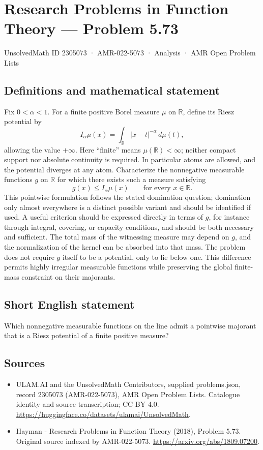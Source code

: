 \documentclass[11pt,a4paper]{article}
\begin{document}
\section*{Research Problems in Function Theory — Problem 5.73}\label{2305073}
{\small UnsolvedMath ID 2305073 · AMR-022-5073 · Analysis · AMR Open Problem Lists}
\subsection{Definitions and mathematical statement}
Fix $0<\alpha<1$. For a finite positive Borel measure $\mu$ on $\mathbb R$, define its Riesz potential by
\[
I_\alpha\mu(x)=\int_{\mathbb R}|x-t|^{-\alpha}\,d\mu(t),
\]
allowing the value $+\infty$. Here ``finite'' means $\mu(\mathbb R)<\infty$; neither compact support nor absolute continuity is required. In particular atoms are allowed, and the potential diverges at any atom.
Characterize the nonnegative measurable functions $g$ on $\mathbb R$ for which there exists such a measure satisfying
\[
g(x)\le I_\alpha\mu(x)\qquad\text{for every }x\in\mathbb R.
\]
This pointwise formulation follows the stated domination question; domination only almost everywhere is a distinct possible variant and should be identified if used. A useful criterion should be expressed directly in terms of $g$, for instance through integral, covering, or capacity conditions, and should be both necessary and sufficient.
The total mass of the witnessing measure may depend on $g$, and the normalization of the kernel can be absorbed into that mass. The problem does not require $g$ itself to be a potential, only to lie below one. This difference permits highly irregular measurable functions while preserving the global finite-mass constraint on their majorants.
\subsection{Short English statement}
Which nonnegative measurable functions on the line admit a pointwise majorant that is a Riesz potential of a finite positive measure?
\subsection{Sources}
\begin{itemize}
\item[S1] ULAM.AI and the UnsolvedMath Contributors, supplied problems.json, record 2305073 (AMR-022-5073), AMR Open Problem Lists. Catalogue identity and source transcription; CC BY 4.0.
\url{https://huggingface.co/datasets/ulamai/UnsolvedMath}.
\item[S2] Hayman - Research Problems in Function Theory (2018), Problem 5.73. Original source indexed by AMR-022-5073.
\url{https://arxiv.org/abs/1809.07200}.
\end{itemize}
\end{document}
